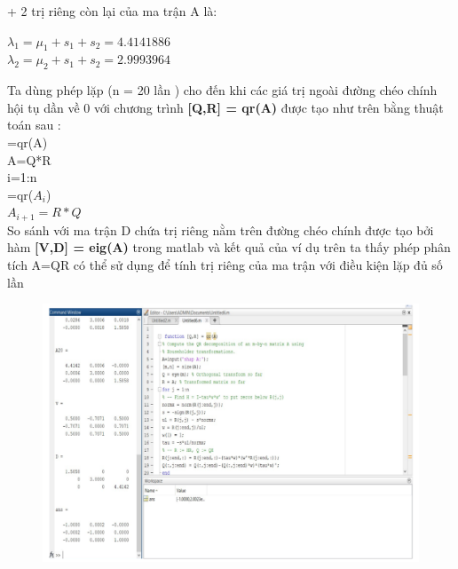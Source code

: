 + 2 trị riêng còn lại của ma trận A là:\\
\begin{center}
	$\lambda_1=\mu_1+s_1+s_2=4.4141886$\\
	$\lambda_2=\mu_2+s_1+s_2=2.9993964$\\
\end{center}
Ta dùng phép lặp (n = 20 lần ) cho đến khi các giá trị ngoài đường chéo chính hội tụ 
dần về 0 với chương trình \textbf{[Q,R] = qr(A)} được tạo như trên bằng thuật toán sau :\\
[Q, R]=qr(A)\\
A=Q*R\\
i=1:n\\
[Q,R]=qr($A_i$)\\
$A_{i+1}=R*Q$\\
So sánh với ma trận D chứa trị riêng nằm trên đường chéo chính được tạo bởi hàm
\textbf{[V,D] = eig(A)} trong matlab và kết quả của ví dụ trên ta thấy phép phân tích A=QR có thể sử dụng để tính trị riêng của ma trận với điều kiện lặp đủ số lần\\
\begin{figure}[!ht]
	\centering
	\includegraphics[scale=0.4]{ttt}
\end{figure}\\
